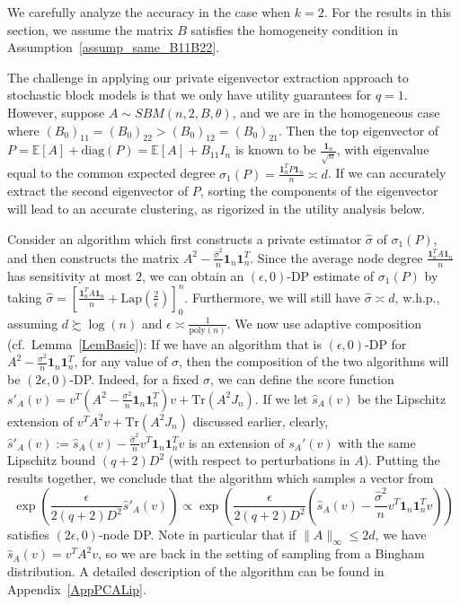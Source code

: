 \documentclass{article}
\newcommand{\E}{\mathbb{E}}
\newcommand{\Tr}{\ensuremath{\mathrm{Tr}}}
\newcommand{\sigmahat}{\ensuremath{\widehat{\sigma}}}
\begin{document}
We carefully analyze the accuracy in the case when $k = 2$. For the results in this section, we assume the matrix $B$ satisfies the homogeneity condition in Assumption~\ref{assump_same_B11B22}.

The challenge in applying our private eigenvector extraction approach to stochastic block models is that we only have utility guarantees for $q=1$. However, suppose $A \sim SBM(n,2,B, \theta)$, and we are in the homogeneous case where $(B_0)_{11} = (B_0)_{22} > (B_0)_{12} = (B_0)_{21}$. Then the top eigenvector of $P = \E[A] + \mathrm{diag}(P) = \E[A] + B_{11}I_n$ is known to be $\frac{\textbf{1}_n}{\sqrt{n}}$, with eigenvalue equal to the common expected degree $\sigma_1(P) = \frac{\mathbf{1}_n^T P\mathbf{1}_n}{n} \asymp d$. If we can accurately extract the second eigenvector of $P$, sorting the components of the eigenvector will lead to an accurate clustering, as rigorized in the utility analysis below.

Consider an algorithm which first constructs a private estimator $\sigmahat$ of $\sigma_1(P)$, and then constructs the matrix $A^2 - \frac{\sigmahat^2}{n} \textbf{1}_n\textbf{1}_n^T$. Since the average node degree $\frac{\textbf{1}_n^T A\textbf{1}_n}{n}$ has sensitivity at most $2$, we can obtain an $(\epsilon, 0)$-DP estimate of $\sigma_1(P)$ by taking $\sigmahat = \left[\frac{\textbf{1}_n^T A\textbf{1}_n}{n} + \mathrm{Lap}\left(\frac{2}{\epsilon}\right)\right]_{0}^n$.
Furthermore, we will still have $\sigmahat \asymp d$, w.h.p., assuming $d \succsim \log(n)$ and $\epsilon \asymp \frac{1}{\mathrm{poly}(n)}$. We now use adaptive composition (cf.\ Lemma~\ref{LemBasic}): If we have an algorithm that is $(\epsilon, 0)$-DP for $A^2 - \frac{\sigma^2}{n} \textbf{1}_n \textbf{1}_n^T$, for any value of $\sigma$, then the composition of the two algorithms will be $(2\epsilon, 0)$-DP. Indeed, for a fixed $\sigma$, we can define the score function $s'_A(v) = v^T(A^2 - \frac{\sigma^2}{n} \textbf{1}_n \textbf{1}_n^T) v + \Tr(A^2 J_n)$. If we let $\widehat{s}_A(v)$ be the Lipschitz extension of $v^TA^2v + \Tr(A^2 J_n)$ discussed earlier, clearly, $\widehat{s}'_A(v) := \widehat{s}_A(v) - \frac{\sigmahat^2}{n} v^T \textbf{1}_n \textbf{1}_n^Tv$ is an extension of $s_A'(v)$ with the same Lipschitz bound $(q+2)D^2$ (with respect to perturbations in $A$). Putting the results together, we conclude that the algorithm which samples a vector from
\begin{equation*}
\exp\left(\frac{\epsilon}{2(q+2)D^2} \widehat{s}'_A(v)\right) \propto \exp\left(\frac{\epsilon}{2(q+2)D^2} \left(\widehat{s}_A(v) - \frac{\sigmahat^2}{n} v^T \textbf{1}_n \textbf{1}_n^T v\right)\right)
\end{equation*}
satisfies $(2\epsilon, 0)$-node DP. Note in particular that if $\|A\|_\infty \leq 2d$, we have $\widehat{s}_A(v) = v^T A^2 v$, so we are back in the setting of sampling from a Bingham distribution. A detailed description of the algorithm can be found in Appendix~\ref{AppPCALip}.
\end{document}
